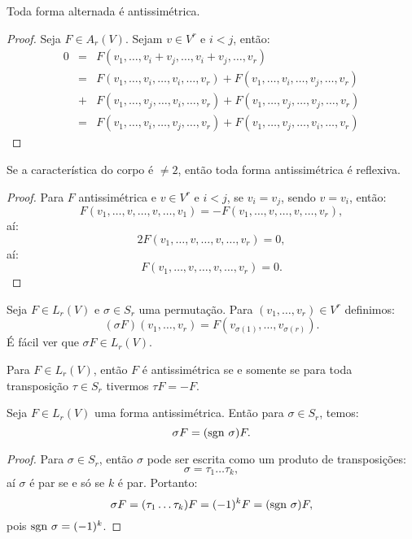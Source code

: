 \documentclass[11pt,twoside,a4paper]{book}
\begin{document}
\begin{proposicao}
Toda forma alternada é antissimétrica.
\end{proposicao}
\begin{proof}
Seja $F\in A_r(V)$. Sejam $v\in V^r$ e $i<j$, então:
\[
\begin{array}{rcl}
0&=&F(v_1,\dots,v_i+v_j,\dots,v_i+v_j,\dots,v_r)\\&=&F(v_1,\dots,v_i,\dots,v_i,\dots,v_r)+F(v_1,\dots,v_i,\dots,v_j,\dots,v_r)\\&+&F(v_1,\dots,v_j,\dots,v_i,\dots,v_r)+F(v_1,\dots,v_j,\dots,v_j,\dots,v_r)\\&=&F(v_1,\dots,v_i,\dots,v_j,\dots,v_r)+F(v_1,\dots,v_j,\dots,v_i,\dots,v_r)
\end{array}
\]
\end{proof}

\begin{proposicao}
Se a característica do corpo é $\neq 2$, então toda forma antissimétrica é reflexiva.
\end{proposicao}
\begin{proof}
Para $F$ antissimétrica e $v\in V^r$ e $i<j$, se $v_i=v_j$, sendo $v=v_i$, então:
\[
F(v_1,\dots,v,\dots,v,\dots,v_1)=-F(v_1,\dots,v,\dots,v,\dots,v_r),
\]
aí:
\[
2F(v_1,\dots,v,\dots,v,\dots,v_r)=0,
\]
aí:
\[
F(v_1,\dots,v,\dots,v,\dots,v_r)=0.
\]
\end{proof}

\begin{definicao}
Seja $F\in L_r(V)$ e $\sigma\in S_r$ uma permutação. Para $(v_1,\dots,v_r)\in V^r$ definimos:
\[
(\sigma F)\left(v_1,\dots,v_r\right)=F\left(v_{\sigma(1)},\dots,v_{\sigma(r)}\right).
\]
É fácil ver que $\sigma F\in L_r(V)$.
\end{definicao}

\begin{observacao}
Para $F\in L_r(V)$, então $F$ é antissimétrica se e somente se para toda transposição $\tau\in S_r$ tivermos $\tau F=-F$.
\end{observacao}

\begin{proposicao}
Seja $F\in L_r(V)$ uma forma antissimétrica. Então para $\sigma\in S_r$, temos:
\[
\sigma F=(\sgn \ \sigma)F.
\]
\end{proposicao}
\begin{proof}
Para $\sigma\in S_r$, então $\sigma$ pode ser escrita como um produto de transposições:
\[
\sigma=\tau_1\dots\tau_k,
\]
aí $\sigma$ é par se e só se $k$ é par. Portanto:
\[
\sigma F=(\tau_1\dots\tau_k)F=(-1)^k F=({\rm sgn} \ \sigma)F,
\]
pois ${\rm sgn} \ \sigma=(-1)^k$.
\end{proof}
\end{document}
